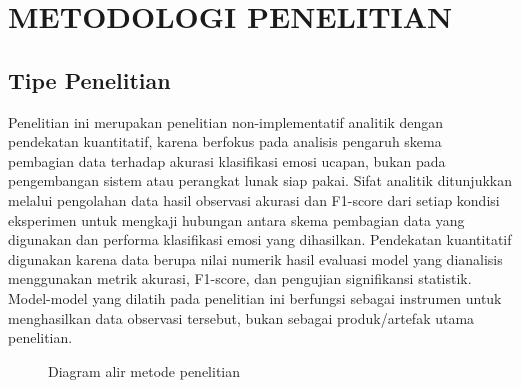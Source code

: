 
\chapter{\MakeUppercase{Metodologi Penelitian}}

\section{Tipe Penelitian}
\label{sec:3.1}

Penelitian ini merupakan penelitian non-implementatif analitik dengan
pendekatan kuantitatif, karena berfokus pada analisis pengaruh skema
pembagian data terhadap akurasi klasifikasi emosi ucapan, bukan pada
pengembangan sistem atau perangkat lunak siap pakai. Sifat analitik
ditunjukkan melalui pengolahan data hasil observasi akurasi dan F1-score
dari setiap kondisi eksperimen untuk mengkaji hubungan antara skema
pembagian data yang digunakan dan performa klasifikasi emosi yang
dihasilkan. Pendekatan kuantitatif digunakan karena data berupa nilai
numerik hasil evaluasi model yang dianalisis menggunakan metrik akurasi,
F1-score, dan pengujian signifikansi statistik. Model-model yang
dilatih pada penelitian ini berfungsi sebagai instrumen untuk
menghasilkan data observasi tersebut, bukan sebagai produk/artefak
utama penelitian.

\begin{figure}[H]
  \centering
  \caption{Diagram alir metode penelitian}
  \label{fig:3.alur}
\end{figure}

